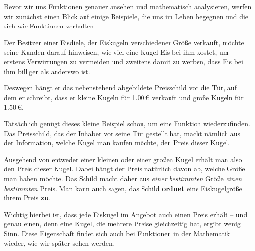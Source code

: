 \documentclass[../../main.tex]{subfiles}
\begin{document}
Bevor wir uns Funktionen genauer ansehen und mathematisch analysieren, werfen wir zunächst einen Blick auf einige Beispiele, die uns im Leben begegnen und die sich wie Funktionen verhalten.

\begin{example}{}
    Der Besitzer einer Eisdiele, der Eiskugeln verschiedener Größe verkauft, möchte seine Kunden darauf hinweisen, wie viel eine Kugel Eis bei ihm kostet, um erstens Verwirrungen zu vermeiden und zweitens damit zu werben, dass Eis bei ihm billiger als anderswo ist.
    
    Deswegen hängt er das nebenstehend abgebildete Preisschild vor die Tür, auf dem er schreibt, dass er kleine Kugeln für 1.00\,\euro{} verkauft und große Kugeln für 1.50\,\euro.
    
    Tatsächlich genügt dieses kleine Beispiel schon, um eine Funktion wiederzufinden. Das Preisschild, das der Inhaber vor seine Tür gestellt hat, macht nämlich aus der Information, welche Kugel man kaufen möchte, den Preis dieser Kugel.
    
    Ausgehend von entweder einer kleinen oder einer großen Kugel erhält man also den Preis dieser Kugel. Dabei hängt der Preis natürlich davon ab, welche Größe man haben möchte. Das Schild macht daher aus \emph{einer bestimmten} Größe \emph{einen bestimmten} Preis. Man kann auch sagen, das Schild \textbf{ordnet} eine Eiskugelgröße ihrem Preis \textbf{zu}.
    
    Wichtig hierbei ist, dass jede Eiskugel im Angebot auch einen Preis erhält -- und genau einen, denn eine Kugel, die mehrere Preise gleichzeitig hat, ergibt wenig Sinn. Diese Eigenschaft findet sich auch bei Funktionen in der Mathematik wieder, wie wir später sehen werden.
\end{example}
\end{document}
